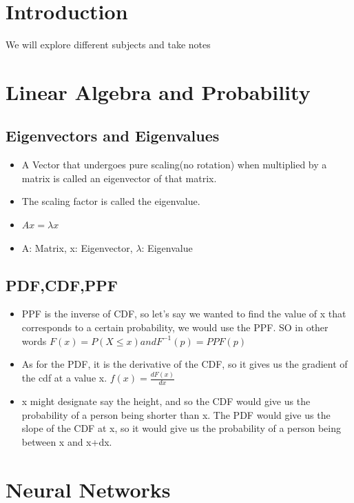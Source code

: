 \documentclass{article}
\begin{document}
\newpage




\section{Introduction}
We will explore different subjects and take notes

\section{Linear Algebra and Probability}
\subsection*{Eigenvectors and Eigenvalues}
\begin{itemize}
    \item A Vector that undergoes pure scaling(no rotation) when multiplied by a matrix is called an eigenvector of that matrix.
    \item The scaling factor is called the eigenvalue.
    \item \(Ax = \lambda x\)
    \item A: Matrix, x: Eigenvector, \(\lambda\): Eigenvalue
\end{itemize}
\subsection*{PDF,CDF,PPF}
\begin{itemize}
  \item PPF is the inverse of CDF, so let's say we wanted to find the value of x that corresponds to a certain probability, we would use the PPF. SO in other words \(F(x) = P(X \leq x) and F^{-1}(p) = PPF(p)\)
  \item As for the PDF, it is the derivative of the CDF, so it gives us the gradient of the cdf at a value x. \(f(x) = \frac{dF(x)}{dx}\)
  \item x might designate say the height, and so the CDF would give us the probability of a person being shorter than x. The PDF would give us the slope of the CDF at x, so it would give us the probability of a person being between x and x+dx.
\end{itemize}
\section*{Neural Networks}
\end{document}
